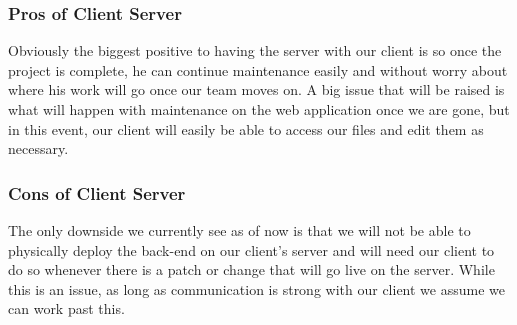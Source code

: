 \documentclass[onecolumn, draftclsnofoot,10pt, compsoc]{IEEEtran}
\begin{document}
\subsubsection{Pros of Client Server}
Obviously the biggest positive to having the server with our client is so once the project is complete, he can continue maintenance easily and without worry about where his work will go once our team moves on. A big issue that will be raised is what will happen with maintenance on the web application once we are gone, but in this event, our client will easily be able to access our files and edit them as necessary. 

\subsubsection{Cons of Client Server}
The only downside we currently see as of now is that we will not be able to physically deploy the back-end on our client’s server and will need our client to do so whenever there is a patch or change that will go live on the server. While this is an issue, as long as communication is strong with our client we assume we can work past this.
\end{document}
